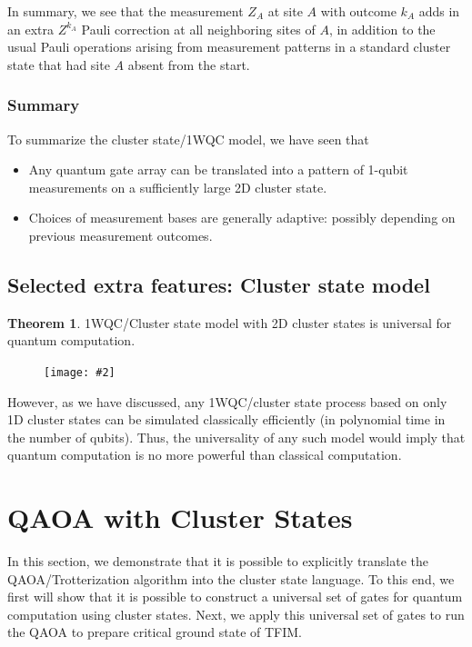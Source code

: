 \documentclass{book}
\theoremstyle{definition}
\newtheorem{thm}{Theorem}[section]
\newcommand{\fig}[2]{
	\begin{figure}[!htb]
		\centering
		\texttt{[image: \#2]}
	\end{figure}}
\begin{document}
In summary, we see that the measurement $Z_A$ at site $A$ with outcome $k_A$ adds in an extra $Z^{k_A}$  Pauli correction at all neighboring sites of $A$, in addition to the usual Pauli operations arising from measurement patterns in a standard cluster state that had site $A$ absent from the start. 



\subsubsection{Summary}

To summarize the cluster state/1WQC model, we have seen that
\begin{itemize}
	\item Any quantum gate array can be translated into a pattern of 1-qubit measurements on a sufficiently large 2D cluster state.
	
	\item Choices of measurement bases are generally adaptive: possibly depending on previous measurement outcomes.
\end{itemize}


\subsection{Selected extra features: Cluster state model}

\begin{thm}
	1WQC/Cluster state model with 2D cluster states is universal for quantum computation. 
\end{thm}

\fig{0.3}{1D}

However, as we have discussed, any 1WQC/cluster state process based on only 1D cluster states can be simulated classically efficiently (in polynomial time in the number of qubits). Thus, the universality of any such model would imply that quantum computation is no more powerful than classical computation. 







\newpage





\section{QAOA with Cluster States}


In this section, we demonstrate that it is possible to explicitly translate the QAOA/Trotterization algorithm into the cluster state language. To this end, we first will show that it is possible to construct a universal set of gates for quantum computation using cluster states. Next, we apply this universal set of gates to run the QAOA to prepare critical ground state of TFIM. 
\end{document}
